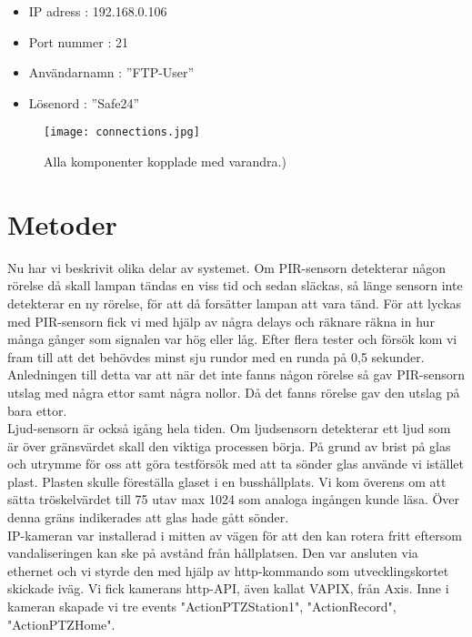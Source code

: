 \begin{itemize}
\item IP adress : 192.168.0.106

\item Port nummer : 21

\item Användarnamn : ”FTP-User”

\item Lösenord : ”Safe24”

\end{itemize}

\begin{figure}[h]

  \texttt{[image: connections.jpg]}
  \caption{Alla komponenter kopplade med varandra.)}
  \label{fig:connections}
\end{figure}
\clearpage



\section{Metoder}
Nu har vi beskrivit olika delar av systemet. Om PIR-sensorn detekterar någon rörelse då skall lampan tändas en viss tid och sedan släckas, så länge sensorn inte detekterar en ny rörelse, för att då forsätter lampan att vara tänd. För att lyckas med PIR-sensorn fick vi med hjälp av några delays och räknare räkna in hur många gånger som signalen var hög eller låg. Efter flera tester och försök kom vi fram till att det behövdes minst sju rundor med en runda på 0,5 sekunder. Anledningen till detta var att när det inte fanns någon rörelse så gav PIR-sensorn utslag med några ettor samt några nollor. Då det fanns rörelse gav den utslag på bara ettor.\\

 Ljud-sensorn är också igång hela tiden. Om ljudsensorn detekterar ett ljud som är över gränsvärdet skall den viktiga processen börja. På grund av brist på glas och utrymme för oss att göra testförsök med att ta sönder glas använde vi istället plast. Plasten skulle föreställa glaset i en busshållplats. Vi kom överens om att sätta tröskelvärdet till 75 utav max 1024 som analoga ingången kunde läsa. Över denna gräns indikerades att glas hade gått sönder.\\

IP-kameran var installerad i mitten av vägen för att den kan rotera fritt eftersom vandaliseringen kan ske på avstånd från hållplatsen. Den var ansluten via ethernet och vi styrde den med hjälp av http-kommando som utvecklingskortet skickade iväg. Vi fick kamerans http-API, även kallat VAPIX, från Axis. Inne i kameran skapade vi tre events "ActionPTZStation1", "ActionRecord", "ActionPTZHome".

